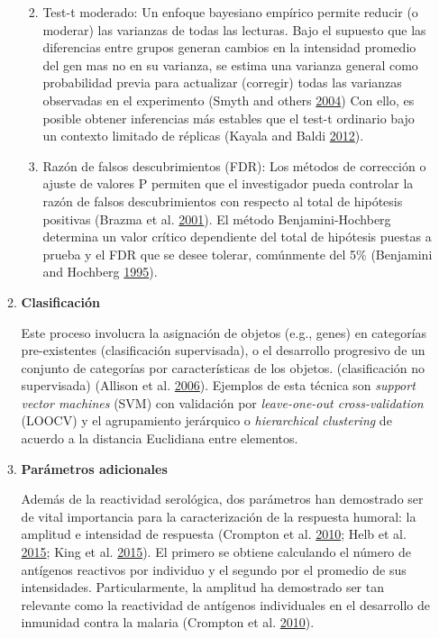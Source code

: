 \documentclass[
  a4paper]{article}
\providecommand{\tightlist}{%
  \setlength{\itemsep}{0pt}\setlength{\parskip}{0pt}}
\begin{document}
\begin{enumerate}
\begin{enumerate}
    \begin{enumerate}
    \def\labelenumiii{\arabic{enumiii}.}
    \tightlist
    \item
      Test-t moderado: Un enfoque bayesiano empírico permite reducir (o
      moderar) las varianzas de todas las lecturas. Bajo el supuesto que
      las diferencias entre grupos generan cambios en la intensidad
      promedio del gen mas no en su varianza, se estima una varianza
      general como probabilidad previa para actualizar (corregir) todas
      las varianzas observadas en el experimento (Smyth and others
      \protect\hyperlink{ref-smyth2004ebayes}{2004}) Con ello, es
      posible obtener inferencias más estables que el test-t ordinario
      bajo un contexto limitado de réplicas (Kayala and Baldi
      \protect\hyperlink{ref-kayala2012cyber}{2012}).
    \item
      Razón de falsos descubrimientos (FDR): Los métodos de corrección o
      ajuste de valores P permiten que el investigador pueda controlar
      la razón de falsos descubrimientos con respecto al total de
      hipótesis positivas (Brazma et al.
      \protect\hyperlink{ref-brazma2001}{2001}). El método
      Benjamini-Hochberg determina un valor crítico dependiente del
      total de hipótesis puestas a prueba y el FDR que se desee tolerar,
      comúnmente del 5\% (Benjamini and Hochberg
      \protect\hyperlink{ref-benjamini1995fdr}{1995}). 
    \end{enumerate}
  \item
    \textbf{Clasificación}

    Este proceso involucra la asignación de objetos (e.g., genes) en
    categorías pre-existentes (clasificación supervisada), o el
    desarrollo progresivo de un conjunto de categorías por
    características de los objetos. (clasificación no supervisada)
    (Allison et al. \protect\hyperlink{ref-allison2006}{2006}). Ejemplos
    de esta técnica son \emph{support vector machines} (SVM) con
    validación por \emph{leave-one-out cross-validation} (LOOCV) y el
    agrupamiento jerárquico o \emph{hierarchical clustering} de acuerdo
    a la distancia Euclidiana entre elementos.
  \item
    \textbf{Parámetros adicionales}

    Además de la reactividad serológica, dos parámetros han demostrado
    ser de vital importancia para la caracterización de la respuesta
    humoral: la amplitud e intensidad de respuesta (Crompton et al.
    \protect\hyperlink{ref-crompton2010}{2010}; Helb et al.
    \protect\hyperlink{ref-Helb2015exposure}{2015}; King et al.
    \protect\hyperlink{ref-King2015FOC}{2015}). El primero se obtiene
    calculando el número de antígenos reactivos por individuo y el
    segundo por el promedio de sus intensidades. Particularmente, la
    amplitud ha demostrado ser tan relevante como la reactividad de
    antígenos individuales en el desarrollo de inmunidad contra la
    malaria (Crompton et al.
    \protect\hyperlink{ref-crompton2010}{2010}). 
  \end{enumerate}
\end{enumerate}
\end{document}
